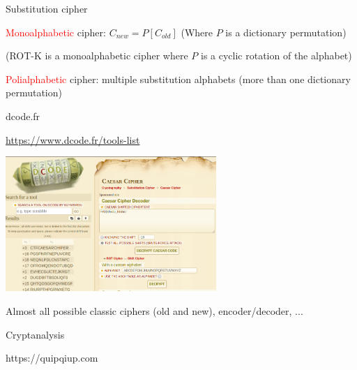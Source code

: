 \begin{frame}{Substitution cipher}


\medskip

\textcolor{red}{Monoalphabetic} cipher: $C_{new} = P[C_{old}]$ (Where $P$ is a dictionary permutation)

(ROT-K is a monoalphabetic cipher where $P$ is a cyclic rotation of the alphabet)

\medskip

\textcolor{red}{Polialphabetic} cipher: multiple substitution alphabets (more than one dictionary permutation)

\medskip

\end{frame}
\begin{frame}{dcode.fr}

\centering

\href{https://www.dcode.fr/tools-list}{https://www.dcode.fr/tools-list}

\medskip

\includegraphics[width=8cm]{img/dcode.png}

\medskip

Almost all possible classic ciphers (old and new), encoder/decoder, ...

\end{frame}
\begin{frame}{Cryptanalysis}

  https://quipqiup.com
  
\end{frame}

